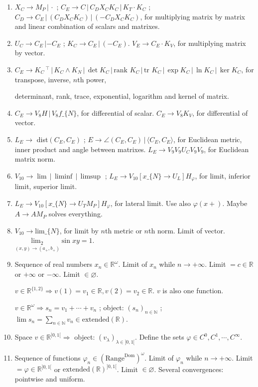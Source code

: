 \documentclass[11pt,a4paper]{article}
\newenvironment{myenum}
{ \begin{enumerate}
    \setlength{\itemsep}{0pt}
    \setlength{\parskip}{0pt}
    \setlength{\parsep}{0pt}     }
{ \end{enumerate}                  }
\begin{document}
\begin{myenum}
		Example: $(a_{11}, a_{12}, a_{13}, a_{21}, a_{22}, a_{23})_{2 \times 3}$ is one matrix.
		\item $X_C \rightarrow M_P\,|\,\cdot$ ; $C_E \rightarrow C\,|\,C_DX_C K_C\,|\,K_T\cdot K_C$ ; $C_D \rightarrow C_E\,|\,(C_DX_C K_C)\,|\,(-C_D X_C K_C)$, for multiplying matrix by matrix and linear combination of scalars and matrixes.
		\item $U_C \rightarrow C_E\,| -C_E$ ; $K_C \rightarrow C_E\,|\,(-C_E)$. $V_E \rightarrow C_E\cdot K_V$, for multiplying matrix by vector.
		\item $C_E \rightarrow K_C\,^\top\,|\,K_C\wedge K_N\,|\,\det K_C\,|\,\text{rank }K_C\,|\,\text{tr }K_C\,|\,\exp K_C\,|\,\ln K_C\,|\,\ker K_C$, for transpose, inverse, $n$th power,

		determinant, rank, trace, exponential, logarithm and kernel of matrix.
		\item $C_E \rightarrow V_8H\,|\,V_8f\_\{N\}$, for differential of scalar. $C_E \rightarrow V_8K_V$, for differential of vector.
		\item $L_E \rightarrow$ dist$(C_E, C_E)$ ; $E \rightarrow \angle(C_E,C_E)\,|\,\langle C_E, C_E \rangle$, for Euclidean metric, inner product and angle between matrixes. $L_E \rightarrow V_9V_9U_CV_9V_9$, for Euclidean matrix norm.
		\item $V_{10} \rightarrow \lim\,|\,\liminf\,|\,\limsup$ ; $L_E \rightarrow V_{10}[x\_\{N\} \rightarrow U_L] H_\varphi$, for limit, inferior limit, superior limit.
		\item $L_E \rightarrow V_{10}[x\_\{N\} \rightarrow U_T M_P] H_\varphi$, for lateral limit. Use also $\varphi(x+)$. Maybe $A \rightarrow AM_P$ solves everything.
		\item $V_{10} \rightarrow \text{lim}\_\{N\}$, for limit by $n$th metric or $n$th norm. Limit of vector. $\underset{(x,y) \rightarrow (a_+,b_+)}{\text{lim}_2} \sin xy = 1$.
		\item Sequence of real numbers $x_n \in \mathbb{R}^\omega$. Limit of $x_n$ while $n \rightarrow +\infty$. Limit $= c \in \mathbb{R}$ or $+\infty$ or $-\infty$. Limit $\in \varnothing$.

		$v \in \mathbb{R}^{\{1,2\}} \Rightarrow v(1) = v_1 \in \mathbb{R}, v(2) = v_2 \in \mathbb{R}$. $v$ is also one function.

		$v \in \mathbb{R}^\omega \Rightarrow s_n = v_1 + \cdots + v_n$ ; object: $(s_n)_{n \in \mathbb{N}}$ ; $\lim s_n = \underset{n \in \mathbb{N}}{\sum} v_n \in \text{extended}(\mathbb{R})$.
		\item Space $v \in \mathbb{R}^{]0,1[} \Rightarrow$ object: $(v_\lambda)_{\lambda \in ]0,1[}$. Define the sets $\varphi \in C^0, C^1, \cdots, C^\infty$.
		\item Sequence of functions $\varphi_n \in (\text{Range}^\text{Dom})^\omega$. Limit of $\varphi_n$ while $n \rightarrow +\infty$. Limit $= \varphi \in \mathbb{R}^{]0,1[}$ or $\text{extended}(\mathbb{R})^{]0,1[}$. Limit $\in \varnothing$. Several convergences: pointwise and uniform.


\end{myenum}
\end{document}
